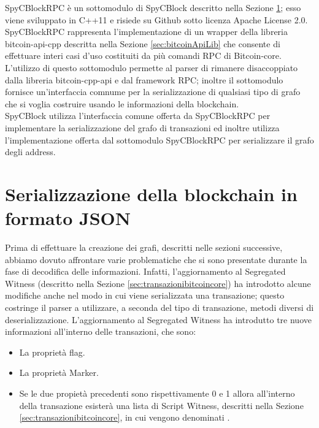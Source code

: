 SpyCBlockRPC è un sottomodulo di SpyCBlock descritto nella Sezione \ref{sec:spycblock}; esso viene sviluppato in C++11 e risiede su Github sotto licenza Apache License 2.0.\\
SpyCBlockRPC rappresenta l'implementazione di un wrapper della libreria bitcoin-api-cpp descritta nella Sezione \ref{sec:bitcoinApiLib} che consente di effettuare interi casi d'uso costituiti da più comandi RPC di Bitcoin-core.
L'utilizzo di questo sottomodulo permette al parser di rimanere disaccoppiato dalla libreria bitcoin-cpp-api e dal framework RPC; inoltre il sottomodulo fornisce un'interfaccia comnume per la serializzazione di qualsiasi tipo di grafo che si voglia costruire usando le informazioni della blockchain.\\
SpyCBlock utilizza l'interfaccia comune offerta da SpyCBlockRPC per implementare la serializzazione del grafo di transazioni ed inoltre utilizza l'implementazione offerta dal sottomodulo SpyCBlockRPC per serializzare il grafo degli address.

\section{Serializzazione della blockchain in formato JSON} \label{sec:spycblock}

Prima di effettuare la creazione dei grafi, descritti nelle sezioni successive, abbiamo dovuto affrontare varie problematiche che si sono presentate durante la fase di decodifica delle informazioni. Infatti, l'aggiornamento al Segregated Witness (descritto nella Sezione \ref{sec:transazionibitcoincore}) ha introdotto alcune modifiche anche nel modo in cui viene serializzata una transazione; questo costringe il parser a utilizzare, a seconda del tipo di transazione, metodi diversi di deserializzazione.
L'aggiornamento al Segregated Witness ha introdutto tre nuove informazioni all'interno delle transazioni, che sono:
\begin{itemize}
  \item La proprietà flag.
  \item La proprietà Marker.
  \item Se le due propietà precedenti sono rispettivamente 0 e 1 allora all'interno della transazione esisterà una lista di Script Witness, descritti nella Sezione \ref{sec:transazionibitcoincore}, in cui vengono denominati .
\end{itemize}


